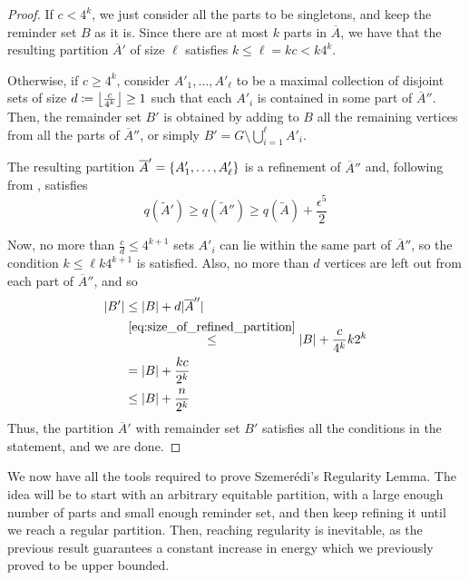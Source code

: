 \begin{lemma}
\begin{proof}
                If $c < 4^k$, we just consider all the parts to be singletons, and keep the reminder set $B$ as it is.
                Since there are at most $k$ parts in $\overline{A}$, we have that the resulting partition $\overline{A}'$
                of size $\ell$ satisfies $k \leq \ell = kc < k 4^k$.

                Otherwise, if $c \geq 4^k$, consider $A'_1, \dots, A'_\ell$ to be a maximal collection of disjoint
                sets of size $d \coloneqq \left\lfloor \frac{c}{4^k} \right\rfloor \geq 1$ such that each $A'_i$ is contained in some part of
                $\overline{A}''$.
                Then, the remainder set $B'$ is obtained by adding to $B$ all the remaining vertices from all the parts
                of $\overline{A}''$, or simply $B' = G \setminus \bigcup_{i=1}^\ell A'_i$.

                The resulting partition $\overline{A}' = \{ A'_1, \dots, A'_\ell \}$ is a refinement of
                $\overline{A}''$ and, following  from
                , satisfies
                \[
                    q(\widetilde{A}') \geq q(\widetilde{A}'') \geq q(\widetilde{A}) + \frac{\epsilon^5}{2}
                \]

                Now, no more than $\frac{c}{d} \leq 4^{k+1}$ sets $A'_i$ can lie within the same part of $\overline{A}''$,
                so the condition $k \leq \ell k 4^{k+1}$ is satisfied.
                Also, no more than $d$ vertices are left out from each part of $\overline{A}''$, and so
                \begin{align*}
                    |B'|
                        & \leq |B| + d |\overline{A}''| \\
                        & \stackrel{\eqref{eq:size_of_refined_partition}}{\leq}
                            |B| + \frac{c}{4^k} k 2^k \\
                        & = |B| + \frac{kc}{2^k} \\
                        & \leq |B| + \frac{n}{2^k}
                \end{align*}
                Thus, the partition $\overline{A}'$ with remainder set $B'$ satisfies all the conditions in the statement,
                and we are done.
            \end{proof}
        \end{lemma}

        We now have all the tools required to prove Szemer\'edi's Regularity Lemma.
        The idea will be to start with an arbitrary equitable partition, with a large enough number of parts and small
        enough reminder set, and then keep refining it until we reach a regular partition.
        Then, reaching regularity is inevitable, as the previous result guarantees a constant increase in energy
        which we previously proved to be upper bounded.

